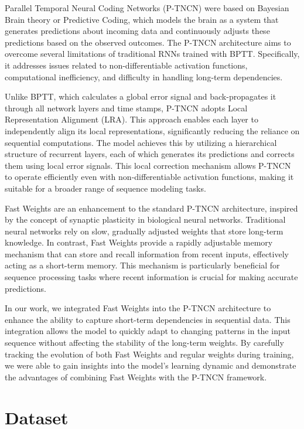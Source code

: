 \documentclass{article}
\begin{document}
Parallel Temporal Neural Coding Networks (P-TNCN) were based on Bayesian Brain theory or Predictive Coding, which models the brain as a system that generates predictions about incoming data and continuously adjusts these predictions based on the observed outcomes. The P-TNCN architecture aims to overcome several limitations of traditional RNNs trained with BPTT. Specifically, it addresses issues related to non-differentiable activation functions, computational inefficiency, and difficulty in handling long-term dependencies.

Unlike BPTT, which calculates a global error signal and back-propagates it through all network layers and time stamps, P-TNCN adopts Local Representation Alignment (LRA). This approach enables each layer to independently align its local representations, significantly reducing the reliance on sequential computations. The model achieves this by utilizing a hierarchical structure of recurrent layers, each of which generates its predictions and corrects them using local error signals. This local correction mechanism allows P-TNCN to operate efficiently even with non-differentiable activation functions, making it suitable for a broader range of sequence modeling tasks.

Fast Weights are an enhancement to the standard P-TNCN architecture, inspired by the concept of synaptic plasticity in biological neural networks. Traditional neural networks rely on slow, gradually adjusted weights that store long-term knowledge. In contrast, Fast Weights provide a rapidly adjustable memory mechanism that can store and recall information from recent inputs, effectively acting as a short-term memory. This mechanism is particularly beneficial for sequence processing tasks where recent information is crucial for making accurate predictions.

In our work, we integrated Fast Weights into the P-TNCN architecture to enhance the ability to capture short-term dependencies in sequential data. This integration allows the model to quickly adapt to changing patterns in the input sequence without affecting the stability of the long-term weights. By carefully tracking the evolution of both Fast Weights and regular weights during training, we were able to gain insights into the model’s learning dynamic and demonstrate the advantages of combining Fast Weights with the P-TNCN framework.


\section{Dataset}
\end{document}
